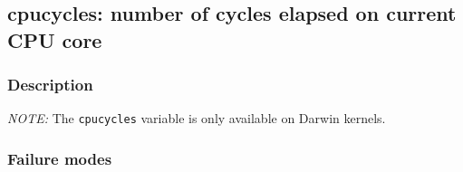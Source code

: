 \clearpage
{}
{}
\label{vars:cpucycles}
\subsection*{cpucycles: number of cycles elapsed on current CPU core}

\subsubsection*{Description}

\emph{NOTE:} The \verb|cpucycles| variable is only available on Darwin
kernels.

\subsubsection*{Failure modes}

